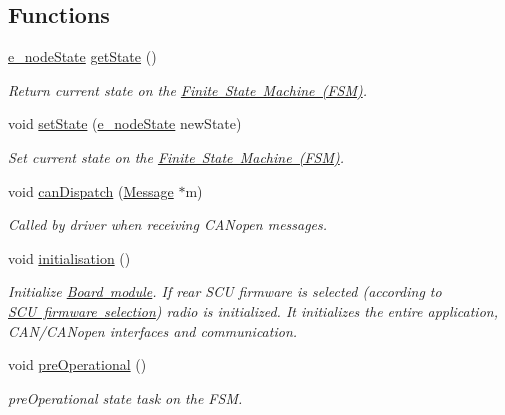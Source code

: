 \subsection*{Functions}
\begin{DoxyCompactItemize}
\item 
\mbox{\hyperlink{group___c_a_nopen___f_s_m__module_ga5891f63a4c9243179838389a93d084e2}{e\+\_\+node\+State}} \mbox{\hyperlink{group___c_a_nopen___f_s_m__module_ga2802a8c3f0174f4e54dd2381968212a0}{get\+State}} ()
\begin{DoxyCompactList}\small\item\em Return current state on the \mbox{\hyperlink{_f_s_m_page}{Finite State Machine (F\+SM)}}. \end{DoxyCompactList}\item 
void \mbox{\hyperlink{group___c_a_nopen___f_s_m__module_ga47cb7615bbcf2c96cc4a7656f9a76bab}{set\+State}} (\mbox{\hyperlink{group___c_a_nopen___f_s_m__module_ga5891f63a4c9243179838389a93d084e2}{e\+\_\+node\+State}} new\+State)
\begin{DoxyCompactList}\small\item\em Set current state on the \mbox{\hyperlink{_f_s_m_page}{Finite State Machine (F\+SM)}}. \end{DoxyCompactList}\item 
void \mbox{\hyperlink{group___c_a_nopen___f_s_m__module_gabbbb23c086599a8d9432a2121ee82192}{can\+Dispatch}} (\mbox{\hyperlink{struct_message}{Message}} $\ast$m)
\begin{DoxyCompactList}\small\item\em Called by driver when receiving C\+A\+Nopen messages. \end{DoxyCompactList}\item 
void \mbox{\hyperlink{group___c_a_nopen___f_s_m__module_gadfffb3be7aa80aea898ada67e93d2388}{initialisation}} ()
\begin{DoxyCompactList}\small\item\em Initialize \mbox{\hyperlink{group___board__model__group}{Board module}}. If rear S\+CU firmware is selected (according to \mbox{\hyperlink{group___s_c_u__firmware__selection}{S\+CU firmware selection}}) radio is initialized. It initializes the entire application, C\+A\+N/\+C\+A\+Nopen interfaces and communication. \end{DoxyCompactList}\item 
void \mbox{\hyperlink{group___c_a_nopen___f_s_m__module_gaf9e8e3744244bcb2f8b6a8583c0bec0c}{pre\+Operational}} ()
\begin{DoxyCompactList}\small\item\em pre\+Operational state task on the F\+SM. \end{DoxyCompactList}\item 

\end{DoxyCompactItemize}
